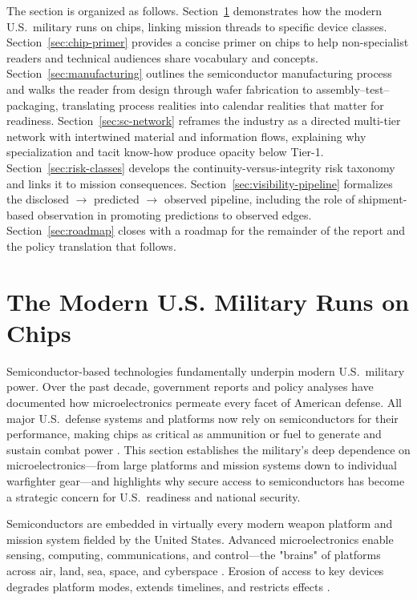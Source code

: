 The section is organized as follows. Section~\ref{sec:framing-thesis} demonstrates how the modern U.S.\ military runs on chips, linking mission threads to specific device classes. Section~\ref{sec:chip-primer} provides a concise primer on chips to help non-specialist readers and technical audiences share vocabulary and concepts. Section~\ref{sec:manufacturing} outlines the semiconductor manufacturing process and walks the reader from design through wafer fabrication to assembly--test--packaging, translating process realities into calendar realities that matter for readiness. Section~\ref{sec:sc-network} reframes the industry as a directed multi-tier network with intertwined material and information flows, explaining why specialization and tacit know-how produce opacity below Tier-1. Section~\ref{sec:risk-classes} develops the continuity-versus-integrity risk taxonomy and links it to mission consequences. Section~\ref{sec:visibility-pipeline} formalizes the disclosed $\rightarrow$ predicted $\rightarrow$ observed pipeline, including the role of shipment-based observation in promoting predictions to observed edges. Section~\ref{sec:roadmap} closes with a roadmap for the remainder of the report and the policy translation that follows.

\section{The Modern U.S. Military Runs on Chips}
\label{sec:framing-thesis}

Semiconductor-based technologies fundamentally underpin modern U.S.\ military power. Over the past decade, government reports and policy analyses have documented how microelectronics permeate every facet of American defense. All major U.S.\ defense systems and platforms now rely on semiconductors for their performance, making chips as critical as ammunition or fuel to generate and sustain combat power \parencite{ch5_dod2022_supplychains,shivakumar_semiconductors_2022,national_academies_assured_2024}. This section establishes the military's deep dependence on microelectronics---from large platforms and mission systems down to individual warfighter gear---and highlights why secure access to semiconductors has become a strategic concern for U.S.\ readiness and national security.

Semiconductors are embedded in virtually every modern weapon platform and mission system fielded by the United States. Advanced microelectronics enable sensing, computing, communications, and control---the "brains" of platforms across air, land, sea, space, and cyberspace \parencite{ch5_dod2022_supplychains}. Erosion of access to key devices degrades platform modes, extends timelines, and restricts effects \parencite{TheWhiteHouse2021,national_academies_assured_2024}.

